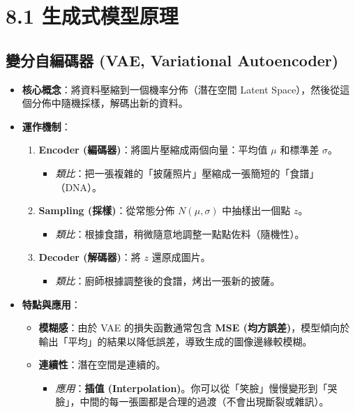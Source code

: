 \documentclass[
  letterpaper,
  DIV=11,
  numbers=noendperiod]{scrreprt}
\providecommand{\tightlist}{%
  \setlength{\itemsep}{0pt}\setlength{\parskip}{0pt}}
\begin{document}
\chapter{8.1 生成式模型原理}\label{sec-generative-models}

\section{變分自編碼器 (VAE, Variational Autoencoder)}\label{sec-vae}

\begin{itemize}
\tightlist
\item
  \textbf{核心概念}：將資料壓縮到一個機率分佈（潛在空間 Latent
  Space），然後從這個分佈中隨機採樣，解碼出新的資料。
\item
  \textbf{運作機制}：

  \begin{enumerate}
  \def\labelenumi{\arabic{enumi}.}
  \tightlist
  \item
    \textbf{Encoder (編碼器)}：將圖片壓縮成兩個向量：平均值 \(\mu\)
    和標準差 \(\sigma\)。

    \begin{itemize}
    \tightlist
    \item
      \emph{類比}：把一張複雜的「披薩照片」壓縮成一張簡短的「食譜」（DNA）。
    \end{itemize}
  \item
    \textbf{Sampling (採樣)}：從常態分佈 \(N(\mu, \sigma)\)
    中抽樣出一個點 \(z\)。

    \begin{itemize}
    \tightlist
    \item
      \emph{類比}：根據食譜，稍微隨意地調整一點點佐料（隨機性）。
    \end{itemize}
  \item
    \textbf{Decoder (解碼器)}：將 \(z\) 還原成圖片。

    \begin{itemize}
    \tightlist
    \item
      \emph{類比}：廚師根據調整後的食譜，烤出一張新的披薩。
    \end{itemize}
  \end{enumerate}
\item
  \textbf{特點與應用}：

  \begin{itemize}
  \tightlist
  \item
    \textbf{模糊感}：由於 VAE 的損失函數通常包含 \textbf{MSE
    (均方誤差)}，模型傾向於輸出「平均」的結果以降低誤差，導致生成的圖像邊緣較模糊。
  \item
    \textbf{連續性}：潛在空間是連續的。

    \begin{itemize}
    \tightlist
    \item
      \emph{應用}：\textbf{插值
      (Interpolation)}。你可以從「笑臉」慢慢變形到「哭臉」，中間的每一張圖都是合理的過渡（不會出現斷裂或雜訊）。
    \end{itemize}
  \end{itemize}
\end{itemize}
\end{document}
